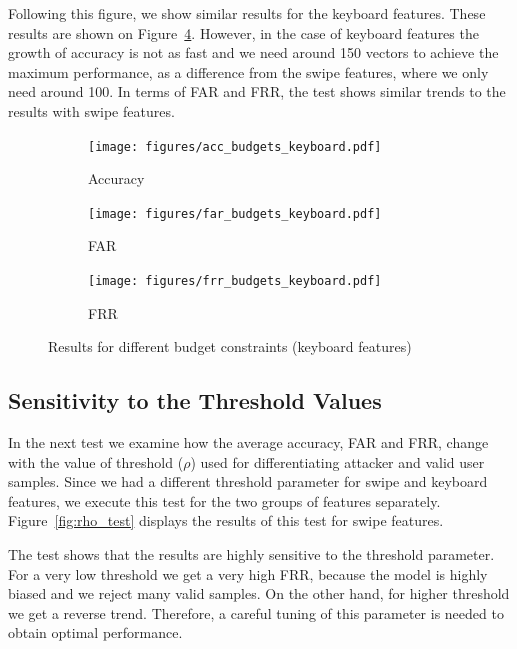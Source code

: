 \documentclass{llncs}
\begin{document}
Following this figure, we show similar results for the keyboard features. These results are shown on Figure~\ref{fig:budgets_keyboard}. However, in the case of keyboard features the growth of accuracy is not as fast and we need around 150 vectors to achieve the maximum performance, as a difference from the swipe features, where we only need around 100. In terms of FAR and FRR, the test shows similar trends to the results with swipe features.

\begin{figure}[!t]
    \centering
    \begin{subfigure}{0.32\textwidth}
        \texttt{[image: figures/acc\_budgets\_keyboard.pdf]}
        \caption{Accuracy}
        \label{fig:accuracy}
    \end{subfigure}
    \hfill
    \begin{subfigure}{0.32\textwidth}
        \texttt{[image: figures/far\_budgets\_keyboard.pdf]}
        \caption{FAR}
        \label{fig:far}
    \end{subfigure}
    \hfill
    \begin{subfigure}{0.32\textwidth}
        \texttt{[image: figures/frr\_budgets\_keyboard.pdf]}
        \caption{FRR}
        \label{fig:frr}
    \end{subfigure}
    \caption{Results for different budget constraints (keyboard features)}\label{fig:budgets_keyboard}
\end{figure}

\subsection{Sensitivity to the Threshold Values}

In the next test we examine how the average accuracy, FAR and FRR, change with the value of threshold ($\rho$) used for differentiating attacker and valid user samples. Since we had a different threshold parameter for swipe and keyboard features, we execute this test for the two groups of features separately. Figure~\ref{fig:rho_test} displays the results of this test for swipe features. 

The test shows that the results are highly sensitive to the threshold parameter. For a very low threshold we get a very high FRR, because the model is highly biased and we reject many valid samples. On the other hand, for higher threshold we get a reverse trend. Therefore, a careful tuning of this parameter is needed to obtain optimal performance.
\end{document}
